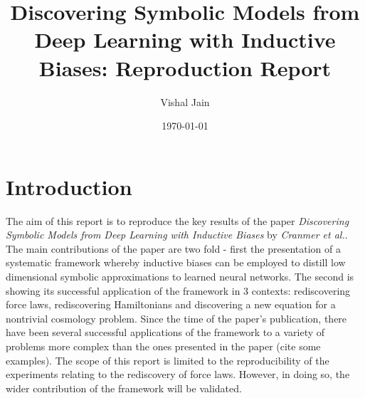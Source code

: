 \documentclass[11pt]{article}
\title{Discovering Symbolic Models from Deep Learning
with Inductive Biases: Reproduction Report}
\author{Vishal Jain}
\date{\today}
\begin{document}
\section{Introduction}






The aim of this report is to reproduce the key results of the paper \textit{Discovering Symbolic Models from Deep Learning with Inductive Biases} by \textit{Cranmer et al.}. The main contributions of the paper are two fold - first the presentation of a systematic framework whereby inductive biases can be employed to distill low dimensional symbolic approximations to learned neural networks. The second is showing its successful application of the framework in 3 contexts: rediscovering force laws, rediscovering Hamiltonians and discovering a new equation for a nontrivial cosmology problem. Since the time of the paper's publication, there have been several successful applications of the framework to a variety of problems more complex than the ones presented in the paper (cite some examples).
The scope of this report is limited to the reproducibility of the experiments relating to the rediscovery of force laws. However, in doing so, the wider contribution of the framework will be validated.
\end{document}
